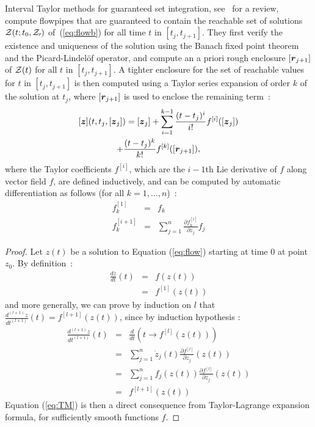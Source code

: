 \documentclass{sig-alternate-05-2015} %
\begin{document}
Interval Taylor methods for guaranteed set integration, see~\cite{Nedialkov99} for a review, compute flowpipes that are guaranteed
 to contain the reachable set of solutions 
${\cal Z}(t;t_0, {\cal Z_0})$ of~(\ref{eq:flowb}) for all time $t$ in $[t_j,t_{j+1}]$. They first verify the existence and uniqueness of 
the solution using the Banach fixed point theorem and the Picard-Lindel\"of operator, and compute an a priori rough enclosure $[{\r}_{j+1}]$ of 
   ${\cal Z}(t)$ for all $t$ in $[t_j,t_{j+1}]$. A tighter enclosure for the set of reachable values for $t$ in $[t_j,t_{j+1}]$ is then computed 
using a Taylor series expansion of order $k$ of the solution at $t_j$, where $[{\r}_{j+1}]$ is used to enclose the remaining term~: 
\begin{multline} 
[\z](t,t_j,[{\z}_j]) =  [{\z}_j] + \sum\limits_{i=1}^{k-1} \frac{(t-t_j)^i}{i !} f^{[i]}([{\z}_j])\\
 + \frac{(t-t_j)^k}{k !} f^{[k]}([{\r}_{j+1}]),
\label{eq:TM}
\end{multline}
where the Taylor coefficients $f^{[i]}$, which are the $i-1$th Lie derivative of $f$ along
vector field $f$, are defined inductively, and 
can be computed by automatic differentiation as follows (for all $k=1,\ldots,n$)~: 
\begin{eqnarray}
f^{[1]}_k & = & f_k \\
f^{[i+1]}_k & = & \sum\limits_{j=1}^n \frac{\partial{f^{[i]}_k}}{\partial z_j} f_j
\label{Lie1}
\end{eqnarray}

\begin{proof}
Let $z(t)$ be a solution to Equation (\ref{eq:flow}) starting at
time 0 at point $z_0$. By definition~: 
$$
\begin{array}{rcl}
\frac{d z}{d t}(t) & = & f(z(t)) \\
& = & f^{[1]}(z(t))
\end{array}$$
\noindent and more generally, we can prove by induction on $l$ that 
$\frac{d^{(l+1)} z}{dt^{(l+1)}}(t) = f^{[l+1]}(z(t))$, 
since by induction hypothesis :
$$\begin{array}{rcl}
\frac{d^{(l+1)} z}{dt^{(l+1)}}(t) & = & \frac{d}{dt}\left(t \rightarrow
f^{[l]}(z(t))\right) \\
& = & \sum\limits_{j=1}^n \dot{z}_j(t) \frac{\partial f^{[l]}}{\partial z_j}(z(t)) \\
& = & \sum\limits_{j=1}^n f_j(z(t)) \frac{\partial f^{[l]}}{\partial z_j}(z(t)) \\
& = & f^{[l+1]}(z(t))
\end{array}$$
Equation (\ref{eq:TM}) is then a direct consequence from Taylor-La\-grange expansion
formula, for sufficiently smooth functions $f$. 
\end{proof}
\end{document}
